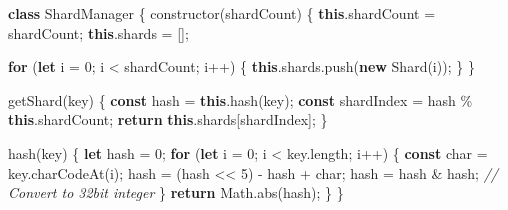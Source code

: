 \documentclass[
]{article}
\newenvironment{Shaded}{}{}
\newcommand{\AttributeTok}[1]{\textcolor[rgb]{0.49,0.56,0.16}{#1}}
\newcommand{\BuiltInTok}[1]{\textcolor[rgb]{0.00,0.50,0.00}{#1}}
\newcommand{\CommentTok}[1]{\textcolor[rgb]{0.38,0.63,0.69}{\textit{#1}}}
\newcommand{\ControlFlowTok}[1]{\textcolor[rgb]{0.00,0.44,0.13}{\textbf{#1}}}
\newcommand{\DecValTok}[1]{\textcolor[rgb]{0.25,0.63,0.44}{#1}}
\newcommand{\FunctionTok}[1]{\textcolor[rgb]{0.02,0.16,0.49}{#1}}
\newcommand{\KeywordTok}[1]{\textcolor[rgb]{0.00,0.44,0.13}{\textbf{#1}}}
\newcommand{\NormalTok}[1]{#1}
\newcommand{\OperatorTok}[1]{\textcolor[rgb]{0.40,0.40,0.40}{#1}}
\begin{document}
\begin{Shaded}
\begin{Highlighting}[]
\KeywordTok{class}\NormalTok{ ShardManager \{}
  \FunctionTok{constructor}\NormalTok{(shardCount) \{}
    \KeywordTok{this}\OperatorTok{.}\AttributeTok{shardCount} \OperatorTok{=}\NormalTok{ shardCount}\OperatorTok{;}
    \KeywordTok{this}\OperatorTok{.}\AttributeTok{shards} \OperatorTok{=}\NormalTok{ []}\OperatorTok{;}

    \ControlFlowTok{for}\NormalTok{ (}\KeywordTok{let}\NormalTok{ i }\OperatorTok{=} \DecValTok{0}\OperatorTok{;}\NormalTok{ i }\OperatorTok{\textless{}}\NormalTok{ shardCount}\OperatorTok{;}\NormalTok{ i}\OperatorTok{++}\NormalTok{) \{}
      \KeywordTok{this}\OperatorTok{.}\AttributeTok{shards}\OperatorTok{.}\FunctionTok{push}\NormalTok{(}\KeywordTok{new} \FunctionTok{Shard}\NormalTok{(i))}\OperatorTok{;}
\NormalTok{    \}}
\NormalTok{  \}}

  \FunctionTok{getShard}\NormalTok{(key) \{}
    \KeywordTok{const}\NormalTok{ hash }\OperatorTok{=} \KeywordTok{this}\OperatorTok{.}\FunctionTok{hash}\NormalTok{(key)}\OperatorTok{;}
    \KeywordTok{const}\NormalTok{ shardIndex }\OperatorTok{=}\NormalTok{ hash }\OperatorTok{\%} \KeywordTok{this}\OperatorTok{.}\AttributeTok{shardCount}\OperatorTok{;}
    \ControlFlowTok{return} \KeywordTok{this}\OperatorTok{.}\AttributeTok{shards}\NormalTok{[shardIndex]}\OperatorTok{;}
\NormalTok{  \}}

  \FunctionTok{hash}\NormalTok{(key) \{}
    \KeywordTok{let}\NormalTok{ hash }\OperatorTok{=} \DecValTok{0}\OperatorTok{;}
    \ControlFlowTok{for}\NormalTok{ (}\KeywordTok{let}\NormalTok{ i }\OperatorTok{=} \DecValTok{0}\OperatorTok{;}\NormalTok{ i }\OperatorTok{\textless{}}\NormalTok{ key}\OperatorTok{.}\AttributeTok{length}\OperatorTok{;}\NormalTok{ i}\OperatorTok{++}\NormalTok{) \{}
      \KeywordTok{const}\NormalTok{ char }\OperatorTok{=}\NormalTok{ key}\OperatorTok{.}\FunctionTok{charCodeAt}\NormalTok{(i)}\OperatorTok{;}
\NormalTok{      hash }\OperatorTok{=}\NormalTok{ (hash }\OperatorTok{\textless{}\textless{}} \DecValTok{5}\NormalTok{) }\OperatorTok{{-}}\NormalTok{ hash }\OperatorTok{+}\NormalTok{ char}\OperatorTok{;}
\NormalTok{      hash }\OperatorTok{=}\NormalTok{ hash }\OperatorTok{\&}\NormalTok{ hash}\OperatorTok{;} \CommentTok{// Convert to 32bit integer}
\NormalTok{    \}}
    \ControlFlowTok{return} \BuiltInTok{Math}\OperatorTok{.}\FunctionTok{abs}\NormalTok{(hash)}\OperatorTok{;}
\NormalTok{  \}}
\NormalTok{\}}
\end{Highlighting}
\end{Shaded}
\end{document}
